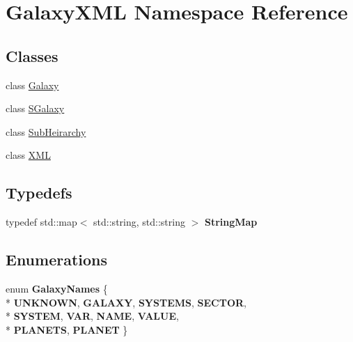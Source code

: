 \hypertarget{namespaceGalaxyXML}{}\section{Galaxy\+X\+ML Namespace Reference}
\label{namespaceGalaxyXML}
\subsection*{Classes}
\begin{DoxyCompactItemize}
\item 
class \hyperlink{classGalaxyXML_1_1Galaxy}{Galaxy}
\item 
class \hyperlink{classGalaxyXML_1_1SGalaxy}{S\+Galaxy}
\item 
class \hyperlink{classGalaxyXML_1_1SubHeirarchy}{Sub\+Heirarchy}
\item 
class \hyperlink{classGalaxyXML_1_1XML}{X\+ML}
\end{DoxyCompactItemize}
\subsection*{Typedefs}
\begin{DoxyCompactItemize}
\item 
typedef std\+::map$<$ std\+::string, std\+::string $>$ {\bfseries String\+Map}\hypertarget{namespaceGalaxyXML_aa29f3f4f258a86e6c4d4e520c8c7f799}{}\label{namespaceGalaxyXML_aa29f3f4f258a86e6c4d4e520c8c7f799}

\end{DoxyCompactItemize}
\subsection*{Enumerations}
\begin{DoxyCompactItemize}
\item 
enum {\bfseries Galaxy\+Names} \{ \\*
{\bfseries U\+N\+K\+N\+O\+WN}, 
{\bfseries G\+A\+L\+A\+XY}, 
{\bfseries S\+Y\+S\+T\+E\+MS}, 
{\bfseries S\+E\+C\+T\+OR}, 
\\*
{\bfseries S\+Y\+S\+T\+EM}, 
{\bfseries V\+AR}, 
{\bfseries N\+A\+ME}, 
{\bfseries V\+A\+L\+UE}, 
\\*
{\bfseries P\+L\+A\+N\+E\+TS}, 
{\bfseries P\+L\+A\+N\+ET}
 \}\hypertarget{namespaceGalaxyXML_a6540aeea78df7fddb1ef120cd03ec1fb}{}\label{namespaceGalaxyXML_a6540aeea78df7fddb1ef120cd03ec1fb}

\end{DoxyCompactItemize}
